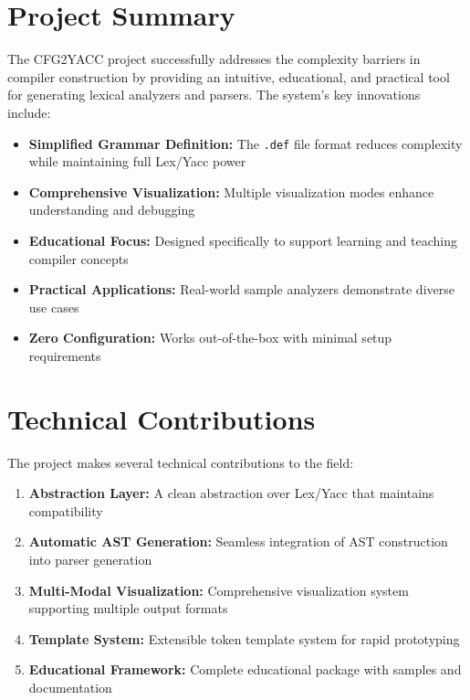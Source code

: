 \documentclass[a4paper,12pt]{report}
\begin{document}
\section{Project Summary}
The CFG2YACC project successfully addresses the complexity barriers in compiler construction by providing an intuitive, educational, and practical tool for generating lexical analyzers and parsers. The system's key innovations include:

\begin{itemize}
    \item \textbf{Simplified Grammar Definition:} The \texttt{.def} file format reduces complexity while maintaining full Lex/Yacc power
    \item \textbf{Comprehensive Visualization:} Multiple visualization modes enhance understanding and debugging
    \item \textbf{Educational Focus:} Designed specifically to support learning and teaching compiler concepts
    \item \textbf{Practical Applications:} Real-world sample analyzers demonstrate diverse use cases
    \item \textbf{Zero Configuration:} Works out-of-the-box with minimal setup requirements
\end{itemize}

\section{Technical Contributions}
The project makes several technical contributions to the field:
\begin{enumerate}
    \item \textbf{Abstraction Layer:} A clean abstraction over Lex/Yacc that maintains compatibility
    \item \textbf{Automatic AST Generation:} Seamless integration of AST construction into parser generation
    \item \textbf{Multi-Modal Visualization:} Comprehensive visualization system supporting multiple output formats
    \item \textbf{Template System:} Extensible token template system for rapid prototyping
    \item \textbf{Educational Framework:} Complete educational package with samples and documentation
\end{enumerate}
\end{document}
